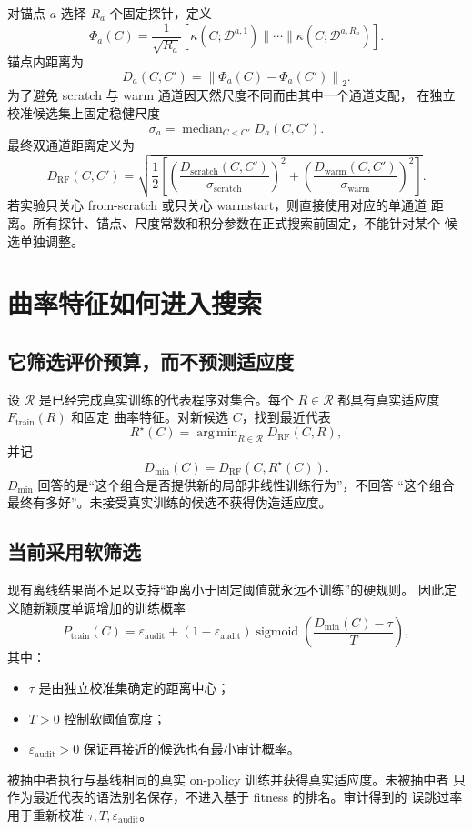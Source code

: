\documentclass[UTF8,11pt]{ctexart}
\newcommand{\concat}{\mathbin{\|}}
\newcommand{\eps}{\varepsilon}
\DeclareMathOperator{\median}{median}
\DeclareMathOperator{\sigmoid}{sigmoid}
\DeclareMathOperator*{\argmin}{arg\,min}
\begin{document}
对锚点 \(a\) 选择 \(R_a\) 个固定探针，定义
\[
    \Phi_a(C)
    =
    \frac1{\sqrt{R_a}}
    \left[
    \kappa(C;\mathcal D^{a,1})
    \concat\cdots\concat
    \kappa(C;\mathcal D^{a,R_a})
    \right].
\]
锚点内距离为
\[
    D_a(C,C')
    =
    \left\|\Phi_a(C)-\Phi_a(C')\right\|_2.
\]
为了避免 scratch 与 warm 通道因天然尺度不同而由其中一个通道支配，
在独立校准候选集上固定稳健尺度
\[
    \sigma_a
    =
    \median_{C<C'}D_a(C,C').
\]
最终双通道距离定义为
\[
    D_{\mathrm{RF}}(C,C')
    =
    \sqrt{
    \frac12
    \left[
    \left(\frac{D_{\mathrm{scratch}}(C,C')}{\sigma_{\mathrm{scratch}}}\right)^2
    +
    \left(\frac{D_{\mathrm{warm}}(C,C')}{\sigma_{\mathrm{warm}}}\right)^2
    \right]
    }.
    \label{eq:dual-distance}
\]
若实验只关心 from-scratch 或只关心 warmstart，则直接使用对应的单通道
距离。所有探针、锚点、尺度常数和积分参数在正式搜索前固定，不能针对某个
候选单独调整。

\section{曲率特征如何进入搜索}

\subsection{它筛选评价预算，而不预测适应度}

设 \(\mathcal R\) 是已经完成真实训练的代表程序对集合。每个
\(R\in\mathcal R\) 都具有真实适应度 \(F_{\mathrm{train}}(R)\) 和固定
曲率特征。对新候选 \(C\)，找到最近代表
\[
    R^\star(C)
    =
    \argmin_{R\in\mathcal R}D_{\mathrm{RF}}(C,R),
\]
并记
\[
    D_{\min}(C)
    =
    D_{\mathrm{RF}}(C,R^\star(C)).
\]
\(D_{\min}\) 回答的是“这个组合是否提供新的局部非线性训练行为”，不回答
“这个组合最终有多好”。未接受真实训练的候选不获得伪造适应度。

\subsection{当前采用软筛选}

现有离线结果尚不足以支持“距离小于固定阈值就永远不训练”的硬规则。
因此定义随新颖度单调增加的训练概率
\[
    P_{\mathrm{train}}(C)
    =
    \eps_{\mathrm{audit}}
    +
    (1-\eps_{\mathrm{audit}})
    \sigmoid\!\left(
    \frac{D_{\min}(C)-\tau}{T}
    \right),
    \label{eq:soft-screen}
\]
其中：
\begin{itemize}
    \item \(\tau\) 是由独立校准集确定的距离中心；
    \item \(T>0\) 控制软阈值宽度；
    \item \(\eps_{\mathrm{audit}}>0\) 保证再接近的候选也有最小审计概率。
\end{itemize}
被抽中者执行与基线相同的真实 on-policy 训练并获得真实适应度。未被抽中者
只作为最近代表的语法别名保存，不进入基于 fitness 的排名。审计得到的
误跳过率用于重新校准 \(\tau,T,\eps_{\mathrm{audit}}\)。
\end{document}
